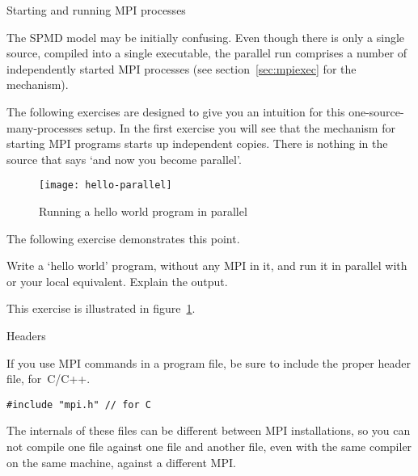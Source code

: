 
 {Starting and running MPI processes}
\label{sec:mpi-start}

The \ac{SPMD} model may be initially confusing. Even though there is
only a single source, compiled into a single executable,
the parallel run comprises a number of independently started MPI
processes (see section~\ref{sec:mpiexec} for the mechanism).

The following exercises are designed to give you an intuition for this
one-source-many-processes setup. In the first exercise you will see
that the mechanism for starting MPI programs starts up independent
copies. There is nothing in the source that says `and now you become parallel'.

\begin{figure}[ht]
  \texttt{[image: hello-parallel]}
  \caption{Running a hello world program in parallel}
  \label{fig:hello-parallel}
\end{figure}

The following exercise demonstrates this point.


\begin{exercise}
  \label{ex:hello1}
  Write a `hello world' program, without any MPI in it,
  and run it in parallel with  or your local equivalent. 
  Explain the output.

\end{exercise}

This exercise is illustrated in figure~\ref{fig:hello-parallel}.

 {Headers}

If you use MPI commands in a program file, be sure to include
the proper header file,  for~C/C++.
\begin{verbatim}
#include "mpi.h" // for C
\end{verbatim}
The internals of these files can be different between MPI
installations, so you can not compile one file against one 
file and another file, even with the same compiler on the same machine,
against a different MPI.

